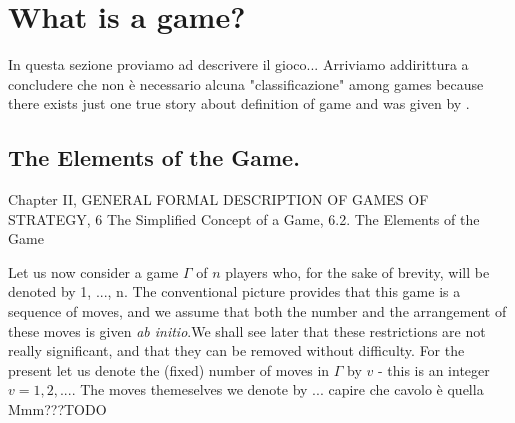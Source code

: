 \chapter{What is a game?}
In questa sezione proviamo ad descrivere il gioco... 
Arriviamo addirittura a concludere che non \`e necessario alcuna "classificazione" among games because there exists just one true story about definition of game and was given by \cite{vonNeumann1944}.

\section{The Elements of the Game. \cite{vonNeumann1944}}
Chapter II, GENERAL FORMAL DESCRIPTION OF GAMES OF STRATEGY, 6 The Simplified Concept of a Game, 6.2. The Elements of the Game

Let us now consider a game $\Gamma$ of $n$ players who, for the sake of brevity, will be denoted by 1, ..., n. The conventional picture provides that this game is a sequence of moves, and we assume that both the number and the arrangement of these moves is given \emph{ab initio}.We shall see later that these restrictions are not really significant, and that they can be removed without difficulty. For the present let us denote the (fixed) number of moves in $\Gamma$ by $v$ - this is an integer $v=1,2,...$. The moves themeselves we denote by ... capire che cavolo \`e quella Mmm???TODO
